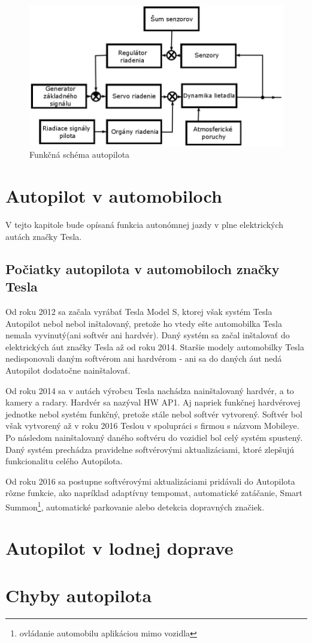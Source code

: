 \documentclass[10pt,twoside,slovak,a4paper]{article}
\begin{document}
\begin{figure}[tbh]
\centering
\includegraphics[scale=0.9]{obr1.jpg}
\caption{Funkčná schéma autopilota}
\label{f:obr1}
\end{figure}

\section{Autopilot v automobiloch}

V tejto kapitole bude opísaná funkcia autonómnej jazdy v plne elektrických autách značky Tesla.

\subsection{Počiatky autopilota v automobiloch značky Tesla}

Od roku 2012 sa začala vyrábať Tesla Model S, ktorej však systém Tesla Autopilot nebol nebol inštalovaný, pretože ho vtedy ešte automobilka Tesla nemala vyvinutý(ani softvér ani hardvér). Daný systém sa začal inštalovať do elektrických áut značky Tesla až od roku 2014. Staršie modely automobilky Tesla nedisponovali daným softvérom ani hardvérom - ani sa do daných áut nedá Autopilot dodatočne nainštalovať. 

Od roku 2014 sa v autách výrobcu Tesla nachádza nainštalovaný hardvér, a to kamery a radary. Hardvér sa nazýval HW AP1. Aj napriek funkčnej hardvérovej jednotke nebol systém funkčný, pretože stále nebol softvér vytvorený. Softvér bol však vytvorený až v roku 2016 Teslou v spolupráci s firmou s názvom Mobileye. Po následom nainštalovaný daného softvéru do vozidiel bol celý systém spustený. Daný systém prechádza pravidelne softvérovými aktualizáciami, ktoré zlepšujú funkcionalitu celého Autopilota.

Od roku 2016 sa postupne softvérovými aktualizáciami pridávali do Autopilota rôzne funkcie, ako napríklad adaptívny tempomat, automatické zatáčanie, Smart Summon\footnote{ovládanie automobilu aplikáciou mimo vozidla}, automatické parkovanie alebo detekcia dopravných značiek. \cite{TeslaAutopilot}

\section{Autopilot v lodnej doprave} \label{AVLD}
\section{Chyby autopilota} \label{chyby}



 
\end{document}
